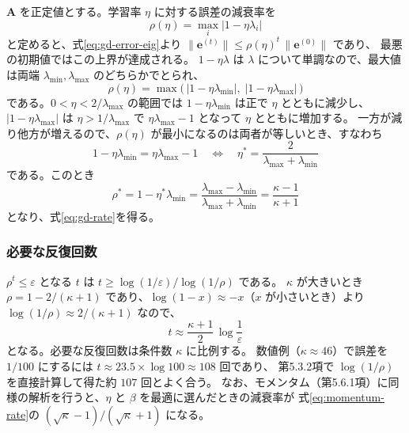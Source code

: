 $\bm{A}$ を正定値とする。学習率 $\eta$ に対する誤差の減衰率を
\begin{equation*}
  \rho(\eta) = \max_{i} |1 - \eta\lambda_i|
\end{equation*}
と定めると、式\eqref{eq:gd-error-eig}より $\|\bm{e}^{(t)}\| \leq \rho(\eta)^t\,\|\bm{e}^{(0)}\|$ であり、
最悪の初期値ではこの上界が達成される。
$1 - \eta\lambda$ は $\lambda$ について単調なので、最大値は両端 $\lambda_{\min}, \lambda_{\max}$ のどちらかでとられ、
\begin{equation*}
  \rho(\eta) = \max\bigl(\,|1 - \eta\lambda_{\min}|,\; |1 - \eta\lambda_{\max}|\,\bigr)
\end{equation*}
である。$0 < \eta < 2/\lambda_{\max}$ の範囲では $1 - \eta\lambda_{\min}$ は正で $\eta$ とともに減少し、
$|1 - \eta\lambda_{\max}|$ は $\eta > 1/\lambda_{\max}$ で $\eta\lambda_{\max} - 1$ となって $\eta$ とともに増加する。
一方が減り他方が増えるので、$\rho(\eta)$ が最小になるのは両者が等しいとき、すなわち
\begin{equation*}
  1 - \eta\lambda_{\min} = \eta\lambda_{\max} - 1
  \quad\Longleftrightarrow\quad
  \eta^* = \frac{2}{\lambda_{\max} + \lambda_{\min}}
\end{equation*}
である。このとき
\begin{equation*}
  \rho^* = 1 - \eta^*\lambda_{\min} = \frac{\lambda_{\max} - \lambda_{\min}}{\lambda_{\max} + \lambda_{\min}} = \frac{\kappa - 1}{\kappa + 1}
\end{equation*}
となり、式\eqref{eq:gd-rate}を得る。

\subsubsection{必要な反復回数}
$\rho^t \leq \varepsilon$ となる $t$ は $t \geq \log(1/\varepsilon) / \log(1/\rho)$ である。
$\kappa$ が大きいとき $\rho = 1 - 2/(\kappa + 1)$ であり、$\log(1 - x) \approx -x$（$x$ が小さいとき）より
$\log(1/\rho) \approx 2/(\kappa + 1)$ なので、
\begin{equation*}
  t \approx \frac{\kappa + 1}{2}\,\log\frac{1}{\varepsilon}
\end{equation*}
となる。必要な反復回数は条件数 $\kappa$ に比例する。
数値例（$\kappa \approx 46$）で誤差を $1/100$ にするには $t \approx 23.5 \times \log 100 \approx 108$ 回であり、
第5.3.2項で $\log(1/\rho)$ を直接計算して得た約 $107$ 回とよく合う。
なお、モメンタム（第5.6.1項）に同様の解析を行うと、$\eta$ と $\beta$ を最適に選んだときの減衰率が
式\eqref{eq:momentum-rate}の $(\sqrt{\kappa} - 1)/(\sqrt{\kappa} + 1)$ になる。

